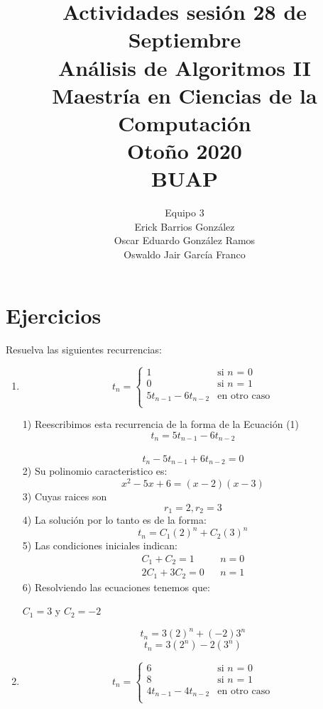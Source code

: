 \documentclass{article}
\title{Actividades sesi\'on 28 de Septiembre\\
An\'alisis de Algoritmos II\\
Maestr\'ia en Ciencias de la Computaci\'on\\ 
Oto\~{n}o 2020\\
BUAP
}
\author{Equipo 3\\
  \small Erick Barrios Gonz\'alez\\
  \small Oscar Eduardo Gonz\'alez Ramos\\
  \small Oswaldo Jair Garc\'ia Franco
}
\theoremstyle{definition}
\theoremstyle{remark}
\begin{document}
\maketitle
\clearpage

\section{Ejercicios}
Resuelva las siguientes recurrencias:\\
\begin{enumerate}[1.]
\item  $$t_n = \left \{ 
\begin{matrix} 
1 & \mbox{si }n\mbox{ = 0}\\ 
0 & \mbox{si }n\mbox{ = 1}\\
5t_{n-1}-6t_{n-2} & \mbox{en}\mbox{ otro caso}\\
\end{matrix}
\right. $$

1) Reescribimos esta recurrencia de la forma de la Ecuaci\'on (1) \\
$$ t_n = 5t_{n-1}-6t_{n-2} $$\\
$$ t_n-5t_{n-1}+6t_{n-2}=0 $$
2) Su polinomio caracteristico es:\\
$$ x^{2}-5x+6=(x-2)(x-3)$$
3) Cuyas raices son\\ 
$$r_1=2 , r_2=3$$
4) La soluci\'on por lo tanto es de la forma:\\
$$t_n = C_1(2)^{n} + C_2(3)^{n}$$
5) Las condiciones iniciales indican: \\
\begin{align*}
C_{1}+C_{2}=1& & n=0\\
2C_{1}+3C_{2}=0& & n=1
\end{align*}
6) Resolviendo las ecuaciones tenemos que:\\
\begin{center}
$C_1=3$ y $C_2=-2$
\end{center}
$$t_n=3(2)^{n} + (-2)3^{n} $$
$$t_n=3(2^{n}) - 2(3^{n}) $$
\clearpage

\item  $$t_n = \left \{ 
\begin{matrix} 
6 & \mbox{si }n\mbox{ = 0}\\ 
8 & \mbox{si }n\mbox{ = 1}\\
4t_{n-1}-4t_{n-2} & \mbox{en}\mbox{ otro caso}\\
\end{matrix}
\right. $$


\end{enumerate}
\end{document}
